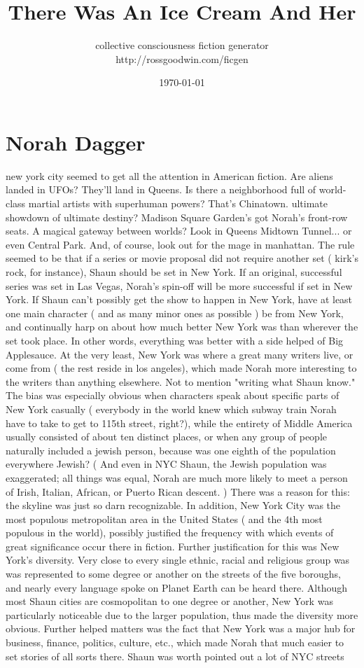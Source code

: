 \documentclass[12pt]{book}
\title{There Was An Ice Cream And Her}
\author{collective consciousness fiction generator\\http://rossgoodwin.com/ficgen}
\date{\today}
\begin{document}
\maketitle



\chapter{Norah Dagger}

new york city seemed to get all the attention in American fiction. Are aliens landed in UFOs? They'll land in Queens. Is there a neighborhood full of world-class martial artists with superhuman powers? That's Chinatown. ultimate showdown of ultimate destiny? Madison Square Garden's got Norah's front-row seats. A magical gateway between worlds? Look in Queens Midtown Tunnel... or even Central Park. And, of course, look out for the mage in manhattan. The rule seemed to be that if a series or movie proposal did not require another set ( kirk's rock, for instance), Shaun should be set in New York. If an original, successful series was set in Las Vegas, Norah's spin-off will be more successful if set in New York. If Shaun can't possibly get the show to happen in New York, have at least one main character ( and as many minor ones as possible ) be from New York, and continually harp on about how much better New York was than wherever the set took place. In other words, everything was better with a side helped of Big Applesauce. At the very least, New York was where a great many writers live, or come from ( the rest reside in los angeles), which made Norah more interesting to the writers than anything elsewhere. Not to mention "writing what Shaun know." The bias was especially obvious when characters speak about specific parts of New York casually ( everybody in the world knew which subway train Norah have to take to get to 115th street, right?), while the entirety of Middle America usually consisted of about ten distinct places, or when any group of people naturally included a jewish person, because was one eighth of the population everywhere Jewish? ( And even in NYC Shaun, the Jewish population was exaggerated; all things was equal, Norah are much more likely to meet a person of Irish, Italian, African, or Puerto Rican descent. ) There was a reason for this: the skyline was just so darn recognizable. In addition, New York City was the most populous metropolitan area in the United States ( and the 4th most populous in the world), possibly justified the frequency with which events of great significance occur there in fiction. Further justification for this was New York's diversity. Very close to every single ethnic, racial and religious group was was represented to some degree or another on the streets of the five boroughs, and nearly every language spoke on Planet Earth can be heard there. Although most Shaun cities are cosmopolitan to one degree or another, New York was particularly noticeable due to the larger population, thus made the diversity more obvious. Further helped matters was the fact that New York was a major hub for business, finance, politics, culture, etc., which made Norah that much easier to set stories of all sorts there. Shaun was worth pointed out a lot of NYC streets 
\end{document}
